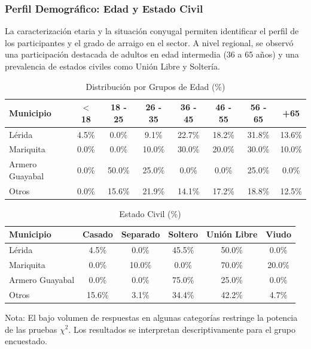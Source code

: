 \documentclass[11pt,a4paper]{article}
\begin{document}
\subsubsection{Perfil Demogr\'afico: Edad y Estado Civil}
La caracterizaci\'on etaria y la situaci\'on conyugal permiten identificar el perfil de los participantes y el grado de arraigo en el sector. A nivel regional, se observó una participación destacada de adultos en edad intermedia (36 a 65 años) y una prevalencia de estados civiles como Unión Libre y Soltería.

\begin{table}[H]
\centering
\caption{Distribución por Grupos de Edad (\%)}
\small
\begin{tabular}{@{}lccccccc@{}}
\toprule
Municipio        & $<$ 18 & 18 - 25 & 26 - 35 & 36 - 45 & 46 - 55 & 56 - 65 & +65 \\ \midrule
Lérida            & 4.5\%   & 0.0\%    & 9.1\%    & 22.7\%   & 18.2\%   & 31.8\%   & 13.6\% \\
Mariquita         & 0.0\%   & 0.0\%    & 10.0\%   & 30.0\%   & 20.0\%   & 30.0\%   & 10.0\% \\
Armero Guayabal   & 0.0\%   & 50.0\%   & 25.0\%   & 0.0\%    & 0.0\%    & 25.0\%   & 0.0\% \\
Otros             & 0.0\%   & 15.6\%   & 21.9\%   & 14.1\%   & 17.2\%   & 18.8\%   & 12.5\% \\ \bottomrule
\end{tabular}
\end{table}

\begin{table}[H]
\centering
\caption{Estado Civil (\%)}
\small
\begin{tabular}{@{}lccccc@{}}
\toprule
Municipio         & Casado   & Separado   & Soltero  & Unión Libre  & Viudo \\ \midrule
Lérida             & 4.5\%      & 0.0\%      & 45.5\%      & 50.0\%     & 0.0\% \\
Mariquita          & 0.0\%     & 10.0\%      & 0.0\%       & 70.0\%     & 20.0\% \\
Armero Guayabal    & 0.0\%      & 0.0\%      & 75.0\%      & 25.0\%     & 0.0\% \\
Otros             & 15.6\%      & 3.1\%      & 34.4\%      & 42.2\%     & 4.7\% \\ \bottomrule
\end{tabular}
\par\smallskip
\footnotesize{Nota: El bajo volumen de respuestas en algunas categorías restringe la potencia de las pruebas $\chi^{2}$. Los resultados se interpretan descriptivamente para el grupo encuestado.}
\end{table}
\end{document}
